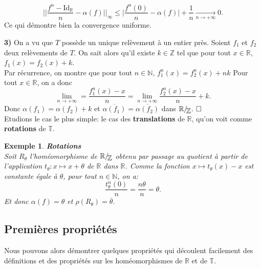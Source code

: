 \documentclass[11pt,a4 paper]{article}
\newtheorem{ex}[theoreme]{Exemple}
\newcommand{\Tbb}{\mathbb{T}}
\newcommand{\Rbb}{\mathbb{R}}
\newcommand{\Id}{\mathrm{Id}}
\newcommand*{\EnsembleQuotient}[2]%
{\ensuremath{%
		#1/\!\raisebox{-.65ex}{\ensuremath{\mathcal{#2}}}}}
\begin{document}
		$$\Big|\Big|\frac{f^n - \Id_{\Rbb}}{n} - \alpha(f)\Big|\Big|_{\infty} \leq \Big|\frac{f^n(0)}{n}-\alpha(f)\Big| + \frac{1}{n} \underset{n \to + \infty}{\longrightarrow}0.$$
	Ce qui démontre bien la convergence uniforme.
	\\
	\par\textbf{3)} On a vu que $T$ possède un unique relèvement à un entier près. Soient $f_1$ et $f_2$ deux relèvements de $T$. On sait alors qu'il existe $k \in \mathbb{Z}$ tel que pour tout $x \in \mathbb{R}$, $f_1(x)=f_2(x)+k$.\\
	Par récurrence, on montre que pour tout $n \in \mathbb{N}$, $f_1^n(x)=f_2^n(x)+nk$
	Pour tout $x \in \mathbb{R}$, on a donc
	$$\underset{n \longrightarrow + \infty}{\lim} = \frac{f_1^n(x)-x}{n} =\underset{n \longrightarrow + \infty}{\lim} \frac{f_2^n(x)-x}{n} + k .$$
	Donc $\alpha(f_1)=\alpha(f_2)+k$ et $\overline{\alpha(f_1)}=\overline{\alpha(f_2)}$ dans $\EnsembleQuotient{\Rbb}{\mathbb{Z}}$.	$ \hfill \square$\\








	


Etudions le cas le plus simple: le cas des \textbf{translations} de $\Rbb$, qu'on voit comme \textbf{rotations} de $\mathbb{T}$.

\begin{ex}\label{rotation}
	\textbf{Rotations}\\
	Soit $R_{\theta}$ l'homéomorphisme de $\EnsembleQuotient{\Rbb}{\mathbb{Z}}$ obtenu par passage au quotient à partir de l'application $t_\theta: x \mapsto x +\theta$ de $\Rbb$ dans $\Rbb$. Comme la fonction $x\mapsto t_\theta(x)-x$ est constante égale à $\theta$, pour tout $n \in \mathbb{N}$, on a:
	$$\frac{t_\theta^n(0)}{n}= \frac{n \theta}{n} = \theta.$$
	Et donc $\alpha(f)=\theta$ et $\rho(R_\theta)=\overline{\theta}.$
\end{ex}






















\subsection{Premières propriétés}
Nous pouvons alors démontrer quelques propriétés qui découlent facilement des définitions et des propriétés sur les homéomorphismes de $\Rbb$ et de $\Tbb$.
\end{document}
